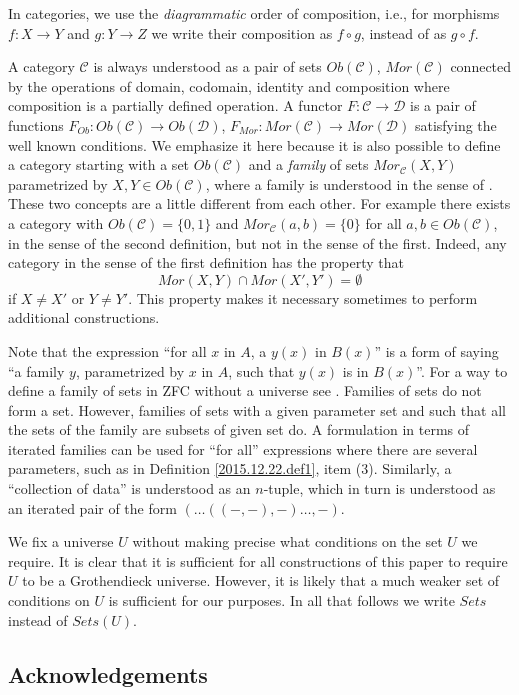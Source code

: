 \documentclass[onecolumn,12pt]{amsart}
\numberwithin{proposition}{subsection}
\newcommand{\sr}{\rightarrow}
\newcommand{\C}{{\mathcal C}}
\newcommand{\D}{{\mathcal D}}
\begin{document}
In categories, we use the {\em diagrammatic} order of composition, i.e., for morphisms $f:X\sr Y$
and $g:Y\sr Z$ we write their composition as $f\circ g$, instead of as $g \circ f$.

A category $\C$ is always understood as a pair of sets $Ob(\C)$, $Mor(\C)$
connected by the operations of domain, codomain, identity and composition where
composition is a partially defined operation. A functor $F:\C\sr \D$ is a pair
of functions $F_{Ob}:Ob(\C)\sr Ob(\D)$, $F_{Mor}:Mor(\C)\sr Mor(\D)$ satisfying
the well known conditions. We emphasize it here because it is also possible to
define a category starting with a set $Ob(\C)$ and a {\em family} of sets
$Mor_{\C}(X,Y)$ parametrized by $X,Y\in Ob(\C)$, where a {family} is understood
in the sense of \cite[Remark 3.9]{fromunivwithPiI}. These two concepts are a
little different from each other. For example there exists a category with
$Ob(\C)=\{0,1\}$ and $Mor_{\C}(a,b)=\{0\}$ for all $a,b\in Ob(\C)$, in the
sense of the second definition, but not in the sense of the first. Indeed, any
category in the sense of the first definition has the property that
%
$$Mor(X,Y)\cap Mor(X',Y')=\emptyset$$
%
if $X\ne X'$ or $Y\ne Y'$. This property makes it necessary sometimes to
perform additional constructions.

Note that the expression ``for all $x$ in $A$, a $y(x)$ in $B(x)$'' is a form
of saying ``a family $y$, parametrized by $x$ in $A$, such that $y(x)$ is in
$B(x)$''. For a way to define a family of sets in ZFC without a universe
see \cite[Remark 3.9]{fromunivwithPiI}. Families of sets do not form a
set. However, families of sets with a given parameter set and such that all the
sets of the family are subsets of given set do. A formulation in terms of
iterated families can be used for ``for all'' expressions where there are
several parameters, such as in Definition \ref{2015.12.22.def1}, item (3). Similarly, a
``collection of data'' is understood as an $n$-tuple, which in turn is understood as
an iterated pair of the form $(\dots((-,-),-)\dots,-)$.

We fix a universe $U$ without making precise what conditions on the set $U$ we
require. It is clear that it is sufficient for all constructions of this paper
to require $U$ to be a Grothendieck universe. However, it is likely that a much
weaker set of conditions on $U$ is sufficient for our purposes. In all that
follows we write $Sets$ instead of $Sets(U)$.

\subsection{Acknowledgements}
\end{document}
